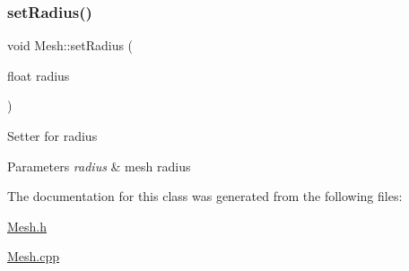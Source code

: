 \subsubsection{\texorpdfstring{set\+Radius()}{setRadius()}}
{\footnotesize\ttfamily void Mesh\+::set\+Radius (\begin{DoxyParamCaption}\item[{float}]{radius }\end{DoxyParamCaption})}

Setter for radius 
\begin{DoxyParams}{Parameters}
{\em radius} & mesh radius \\
\hline
\end{DoxyParams}


The documentation for this class was generated from the following files\+:\begin{DoxyCompactItemize}
\item 
\hyperlink{Mesh_8h}{Mesh.\+h}\item 
\hyperlink{Mesh_8cpp}{Mesh.\+cpp}\end{DoxyCompactItemize}

